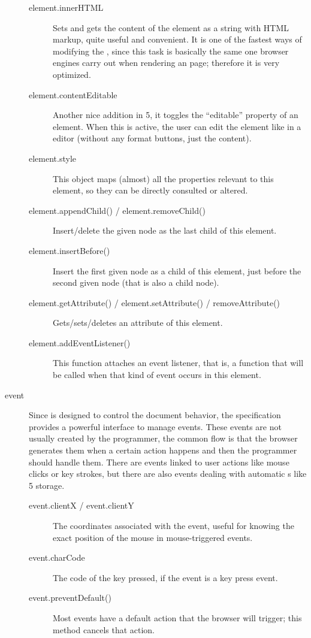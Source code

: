 \begin{description}
\begin{description}
    \item[element.innerHTML] Sets and gets the content of the element as a string with HTML markup, quite useful and convenient.
    It is one of the fastest ways of modifying the , since this task is basically the same one browser engines carry out when rendering an  page; therefore it is very optimized.
    \item[element.contentEditable] Another nice addition in 5, it toggles the ``editable'' property of an element.
    When this is active, the user can edit the element like in a  editor (without any format buttons, just the content).
    \item[element.style] This object maps (almost) all the  properties relevant to this element, so they can be directly consulted or altered.
    \item[element.appendChild() / element.removeChild()] Insert/delete the given node as the last child of this element.
    \item[element.insertBefore()] Insert the first given node as a child of this element, just before the second given node (that is also a child node).
    \item[element.getAttribute() / element.setAttribute() / removeAttribute()] Gets/sets/deletes an attribute of this element.
    \item[element.addEventListener()] This function attaches an event listener, that is, a function that will be called when that kind of event occurs in this element.
  \end{description}
  \item[event] Since  is designed to control the document behavior, the specification provides a powerful interface to manage events.
  These events are not usually created by the programmer, the common flow is that the browser generates them when a certain action happens and then the programmer should handle them.
  There are events linked to user actions like mouse clicks or key strokes, but there are also events dealing with automatic s like 5 storage.
  \begin{description}
    \item[event.clientX / event.clientY] The coordinates associated with the event, useful for knowing the exact position of the mouse in mouse-triggered events.
    \item[event.charCode] The code of the key pressed, if the event is a key press event.
    \item[event.preventDefault()] Most events have a default action that the browser will trigger; this method cancels that action.

\end{description}
\end{description}
